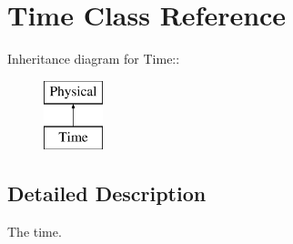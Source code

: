 \section{Time Class Reference}
\label{classTime}
Inheritance diagram for Time::\begin{figure}[H]
\begin{center}
\leavevmode
\includegraphics[height=2cm]{classTime}
\end{center}
\end{figure}


\subsection{Detailed Description}
The time. 

